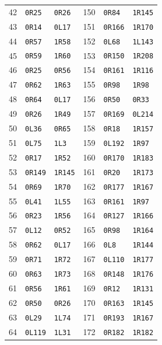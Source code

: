 \begin{longtable}{rll@{\hspace{2em}}rll}
42 & \texttt{0R25} & \texttt{0R26} & 150 & \texttt{0R84} & \texttt{1R145}\\
43 & \texttt{0R14} & \texttt{0L17} & 151 & \texttt{0R166} & \texttt{1R170}\\
44 & \texttt{0R57} & \texttt{1R58} & 152 & \texttt{0L68} & \texttt{1L143}\\
45 & \texttt{0R59} & \texttt{1R60} & 153 & \texttt{0R150} & \texttt{1R208}\\
46 & \texttt{0R25} & \texttt{0R56} & 154 & \texttt{0R161} & \texttt{1R116}\\
47 & \texttt{0R62} & \texttt{1R63} & 155 & \texttt{0R98} & \texttt{1R98}\\
48 & \texttt{0R64} & \texttt{0L17} & 156 & \texttt{0R50} & \texttt{0R33}\\
49 & \texttt{0R26} & \texttt{1R49} & 157 & \texttt{0R169} & \texttt{0L214}\\
50 & \texttt{0L36} & \texttt{0R65} & 158 & \texttt{0R18} & \texttt{1R157}\\
51 & \texttt{0L75} & \texttt{1L3} & 159 & \texttt{0L192} & \texttt{1R97}\\
52 & \texttt{0R17} & \texttt{1R52} & 160 & \texttt{0R170} & \texttt{1R183}\\
53 & \texttt{0R149} & \texttt{1R145} & 161 & \texttt{0R20} & \texttt{1R173}\\
54 & \texttt{0R69} & \texttt{1R70} & 162 & \texttt{0R177} & \texttt{1R167}\\
55 & \texttt{0L41} & \texttt{1L55} & 163 & \texttt{0R161} & \texttt{1R97}\\
56 & \texttt{0R23} & \texttt{1R56} & 164 & \texttt{0R127} & \texttt{1R166}\\
57 & \texttt{0L12} & \texttt{0R52} & 165 & \texttt{0R98} & \texttt{1R164}\\
58 & \texttt{0R62} & \texttt{0L17} & 166 & \texttt{0L8} & \texttt{1R144}\\
59 & \texttt{0R71} & \texttt{1R72} & 167 & \texttt{0L110} & \texttt{1R177}\\
60 & \texttt{0R63} & \texttt{1R73} & 168 & \texttt{0R148} & \texttt{1R176}\\
61 & \texttt{0R56} & \texttt{1R61} & 169 & \texttt{0R12} & \texttt{1R131}\\
62 & \texttt{0R50} & \texttt{0R26} & 170 & \texttt{0R163} & \texttt{1R145}\\
63 & \texttt{0L29} & \texttt{1L74} & 171 & \texttt{0R193} & \texttt{1R167}\\
64 & \texttt{0L119} & \texttt{1L31} & 172 & \texttt{0R182} & \texttt{1R182}\\

\end{longtable}

